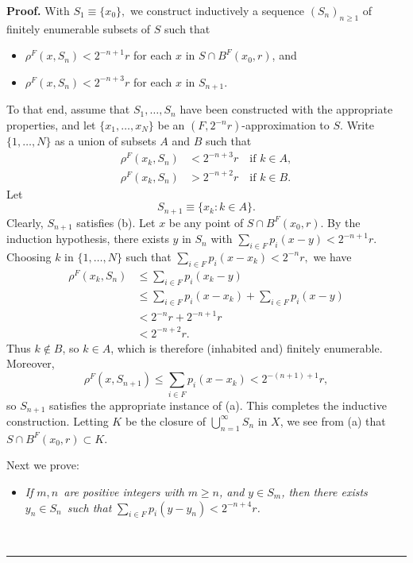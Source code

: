 \documentclass{article}%
\newenvironment{proof}[1][Proof]{\noindent\textbf{#1.} }{\ \rule{0.5em}{0.5em}}
\begin{document}
\begin{proof}
With $S_{1}\equiv\{x_{0}\},$ we construct inductively a sequence
$(S_{n})_{n\geqslant1}$ of finitely enumerable subsets of $S$ such that

\begin{itemize}
\item[(a)] $\rho^{F}(x,S_{n})<2^{-n+1}r$ for each $x$ in $S\cap B^{F}%
(x_{0},r)$, and

\item[(b)] \smallskip$\rho^{F}(x,S_{n})<2^{-n+3}r$ for each $x$ in $S_{n+1}.$
\end{itemize}

%

\noindent
To that end, assume that $S_{1},\ldots,S_{n}$ have been constructed with the
appropriate properties, and let $\{x_{1},\ldots,x_{N}\}$ be an $(F,2^{-n}%
r)$-approximation to $S.$ Write $\{1,\ldots,N\}$ as a union of subsets $A$ and
$B$ such that%
\begin{align*}
\rho^{F}(x_{k},S_{n})  &  <2^{-n+3}r\quad\mathrm{if}\,\,k\in A,\\
\rho^{F}(x_{k},S_{n})  &  >2^{-n+2}r\quad\mathrm{if}\,\,k\in B.
\end{align*}
Let%
\[
S_{n+1}\equiv\{x_{k}:k\in A\}.
\]
Clearly, $S_{n+1}$ satisfies (b). Let $x$ be any point of $S\cap B^{F}%
(x_{0},r).$ By the induction hypothesis, there exists $y$ in $S_{n}$ with
$\sum_{i\in F}p_{i}(x-y)<2^{-n+1}r.$ Choosing $k$ in $\{1,\ldots,N\}$ such
that $\sum_{i\in F}p_{i}(x-x_{k})<2^{-n}r,$ we have
\begin{align*}
\rho^{F}(x_{k},S_{n})  &  \leqslant\sum_{i\in F}p_{i}(x_{k}-y)\\
&  \leqslant\sum_{i\in F}p_{i}(x-x_{k})+\sum_{i\in F}p_{i}(x-y)\\
&  <2^{-n}r+2^{-n+1}r\\
&  <2^{-n+2}r.
\end{align*}
Thus $k\notin B$, so $k\in A$, which is therefore (inhabited and) finitely
enumerable. Moreover,
\[
\rho^{F}(x,S_{n+1})\leq\sum_{i\in F}p_{i}(x-x_{k})<2^{-(n+1)+1}r,
\]
so $S_{n+1}$ satisfies the appropriate instance of (a). This completes the
inductive construction. Letting $K$ be the closure of $\bigcup\limits_{n=1}%
^{\infty}S_{n}$ in $X$, we see from (a) that $S\cap B^{F}(x_{0},r)\subset K.$

Next we prove:

\begin{itemize}
\item[(*)] \emph{If }$m,n$\emph{\ are positive integers with }$m\geq n$\emph{,
and }$y\in S_{m}$\emph{, then there exists }$y_{n}\in S_{n}$\emph{\ such that
}$\sum_{i\in F}p_{i}(y-y_{n})<2^{-n+4}r$\emph{.}
\end{itemize}


\end{proof}
\end{document}
